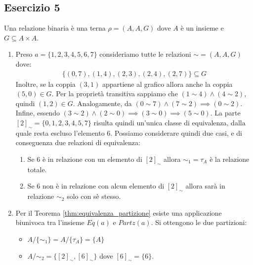 \subsection*{Esercizio 5}
Una relazione binaria è una terna $\rho = (A,A,G)$ dove $A$ è un insieme e $G\subseteq A\times A$.
\begin{enumerate}[label=(\textit{\roman*})]
	\item Preso $a=\{1,2,3,4,5,6,7\}$ consideriamo tutte le relazioni $\sim=(A,A,G)$ dove:
	\begin{align*}
		\{(0,7),(1,4),(2,3),(2,4),(2,7)\} \subseteq G
	\end{align*}
	Inoltre, se la coppia $(3,1)$ appartiene al grafico allora anche la coppia $(5,0) \in G$. Per la proprietà transitiva sappiamo che $(1 \sim 4) \land (4  \sim  2)$, quindi $(1,2) \in G$. Analogamente, da $(0  \sim  7) \land (7 \sim 2)\implies (0 \sim 2)$. Infine, essendo $(3 \sim  2) \land (2 \sim 0) \implies (3 \sim 0) \implies (5 \sim 0)$. La parte $[2]_{\sim}=\{0,1,2,3,4,5,7\}$ risulta quindi un'unica classe di equivalenza, dalla quale resta escluso l'elemento 6. Possiamo considerare quindi due casi, e di conseguenza due relazioni di equivalenza: 
	\begin{enumerate}
		\item Se 6 è in relazione con un elemento di $[2]_{\sim}$ allora $\sim_{1} = \tau_{A}$ è la relazione totale.
		\item Se 6 non è in relazione con alcun elemento di $[2]_{\sim}$ allora sarà in relazione $\sim_{2}$ solo con sè stesso.
	\end{enumerate}
	
	\item Per il Teorema \ref{thm:equivalenza_partizione} esiste una applicazione biunivoca tra l'insieme $Eq(a)$ e $Partz(a)$. Si ottengono le due partizioni:
	\begin{itemize}
		\item $A/\{\sim_{1}\}=A/\{\tau_{A}\}=\{A\}$
		\item $A/{\sim_{2}}=\{[2]_{\sim},[6]_{\sim}\}$ dove $[6]_{\sim}=\{6\}$.
	\end{itemize}
\end{enumerate}
